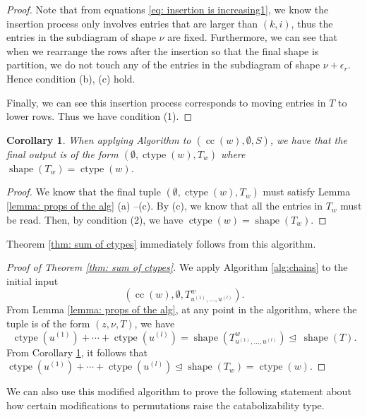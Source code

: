 \documentclass[10pt]{amsart}
\theoremstyle{plain}
\newtheorem{coro}[coro]{Corollary}
\theoremstyle{definition}
\theoremstyle{plain}
\theoremstyle{plain}
\theoremstyle{remark}
\theoremstyle{plain}
\theoremstyle{plain}
\DeclareMathOperator{\ctype}{ctype}
\DeclareMathOperator{\shape}{shape}
\DeclareMathOperator{\cc}{cc}
\begin{document}
\begin{proof}
   Note that from equations \eqref{eq: insertion is increasing1}, we know the insertion process only involves entries that are larger than $(k,i)$, thus the entries in the subdiagram of shape $\nu$ are fixed. 
   Furthermore, we can see that when we rearrange the rows after the insertion so that the final shape is partition, we do not touch any of the entries in the subdiagram of shape $\nu+\epsilon_r$. Hence condition (b), (c) hold.

Finally, we can see this insertion process corresponds to moving entries in $T$ to lower rows. Thus we have condition (1).


    \end{proof}

\begin{coro}\label{cor: output fillling}
   When applying Algorithm to $(\cc(w), \emptyset, S)$, we have that the final output is of the form $(\emptyset, \ctype(w), T_w) $ where  $\shape(T_w) = \ctype(w)$.
\end{coro}
\begin{proof}
We know that the final tuple $(\emptyset, \ctype(w), T_w) $ must satisfy Lemma \ref{lemma: props of the alg} (a) --(c).
By (c), we know that all the entries in $T_w$ must be read. Then, by condition (2), we have $\ctype(w) = \shape(T_w)$.
\end{proof}


    
Theorem \ref{thm: sum of ctypes} immediately follows from this algorithm.
\begin{proof}[Proof of Theorem \ref{thm: sum of ctypes}] 
We apply Algorithm \ref{alg:chains} to the initial input \[(\cc(w), \emptyset, T^w_{u^{(1)}, \dots, u^{(l)}}).\]
From Lemma \ref{lemma: props of the alg}, at any point in the algorithm,  where the tuple is of the form $(z,\nu,T)$, we have  \[\ctype(u^{(1)}) + \cdots +\ctype(u^{(l)})  = \shape (T^w_{u^{(1)},\dots,  u^{(l)}}) \unlhd \ \shape(T).\] From Corollary \ref{cor: output fillling}, it follows that $\ctype(u^{(1)}) + \cdots+ \ctype( u^{(l)})\unlhd \shape (T_w) = \ctype(w)$.    
\end{proof}



    We can also use this modified algorithm to prove the following statement about how certain modifications to permutations raise the catabolizability type.
    
\end{document}

